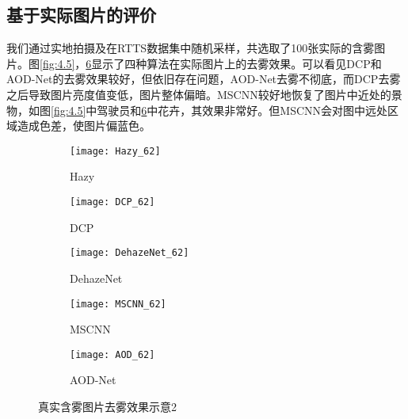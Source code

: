 \documentclass[a4paper, 12pt, oneside]{report}
\begin{document}
{\subsection{基于实际图片的评价\quad}
我们通过实地拍摄及在RTTS数据集中随机采样，共选取了100张实际的含雾图片。图\ref{fig:4.5}，\ref{fig:4.6}显示了四种算法在实际图片上的去雾效果。可以看见DCP和AOD-Net的去雾效果较好，但依旧存在问题，AOD-Net去雾不彻底，而DCP去雾之后导致图片亮度值变低，图片整体偏暗。MSCNN较好地恢复了图片中近处的景物，如图\ref{fig:4.5}中驾驶员和\ref{fig:4.6}中花卉，其效果非常好。但MSCNN会对图中远处区域造成色差，使图片偏蓝色。
\begin{figure}
    \centering
            \begin{subfigure}{.9\linewidth}
                \texttt{[image: Hazy\_62]}
                \caption{Hazy}
                \label{fig:sfig111111}
            \end{subfigure}
        \endminipage\hfill
        \begin{subfigure}{.9\linewidth}
            \texttt{[image: DCP\_62]}
            \caption{DCP}
            \label{fig:sfig222222}
        \end{subfigure} 
        \begin{subfigure}{.9\linewidth}
            \texttt{[image: DehazeNet\_62]}
            \caption{DehazeNet}
            \label{fig:sfig333333}
        \end{subfigure} 
    \endminipage\hfill
        \begin{subfigure}{.9\linewidth}
            \texttt{[image: MSCNN\_62]}
            \caption{MSCNN}
            \label{fig:sfig444444}
        \end{subfigure} 
        \begin{subfigure}{.9\linewidth}
            \texttt{[image: AOD\_62]}
            \caption{AOD-Net}
            \label{fig:sfig555555}
        \end{subfigure} 
    	\endminipage
    \caption{真实含雾图片去雾效果示意2}
	\label{fig:4.6}
\end{figure}

}
\end{document}
